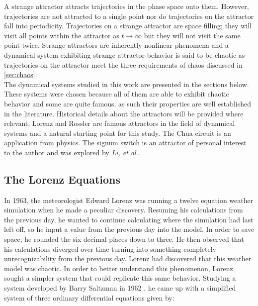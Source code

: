       A strange attractor attracts trajectories in the phase
      space onto them. However, trajectories are not attracted to a single point nor do trajectories on the attractor fall into
      periodicity. Trajectories on a strange attractor are space filling; they will visit all points
      within the attractor as $t\to\infty$ but they will not visit the same point twice.
      Strange attractors are inherently nonlinear phenomena
      and a dynamical system exhibiting strange attractor behavior is said to be chaotic as trajectories on the attractor
      meet the three requirements of chaos discussed in \textsection\ref{sec:chaos}.\\

      The dynamical systems studied in this work are presented in the sections below. These systems were chosen because all
      of them are able to exhibit chaotic behavior and some are quite famous; as such their properties are well established
      in the literature. Historical details about the attractors will be provided where relevant.
      Lorenz and Rossler are famous attractors in the field of dynamical systems and a natural starting point for this study.
      The Chua circuit is an application from physics. The signum switch is an attractor of personal interest to the author
      and was explored by \textit{Li, et al.}\cite{item:6}.\\

    \subsection{The Lorenz Equations}

          In 1963, the meteorologist Edward Lorenz was running a twelve equation weather simulation when he made
          a peculiar discovery. Resuming his calculations from the previous day, he wanted to continue calculating where the simulation had last left off,
          so he input a value from the previous day into the model. In order to save space, he rounded the six
          decimal places down to three. He then observed that his calculations diverged over time turning into something completely
          unrecognizability from the previous day. Lorenz had discovered that this weather model was chaotic.
          In order to better understand this phenomenon, Lorenz sought a simpler system that could replicate
          this same behavior. Studying a system developed by Barry Saltzman in 1962 \cite{item:25}\cite{item:26},
            he came up with a simplified system of three ordinary differential equations given by:

